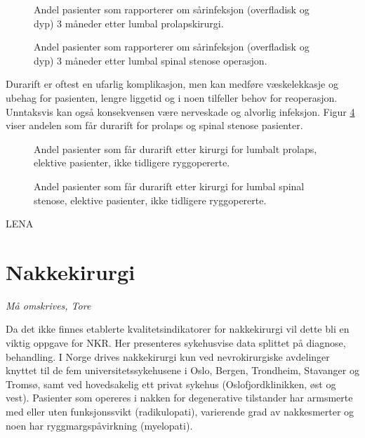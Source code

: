 \documentclass [norsk,a4paper,twoside]{article}\usepackage[]{graphicx}\usepackage[]{color}
\begin{document}
\begin{figure}[ht]
\caption{\label{fig:KpInfAvdPro} Andel pasienter som rapporterer om sårinfeksjon 
      (overfladisk og dyp) 3 måneder etter lumbal prolapskirurgi.}
\end{figure}

\begin{figure}[ht]
\caption{\label{fig:KpInfAvdSS} Andel pasienter som rapporterer om sårinfeksjon 
      (overfladisk og dyp) 3 måneder etter lumbal spinal stenose operasjon.}
\end{figure}





Durarift er oftest en ufarlig komplikasjon, men kan medføre væskelekkasje og
ubehag for pasienten, lengre liggetid og i noen tilfeller behov for reoperasjon.
Unntaksvis kan også konsekvensen være nerveskade og alvorlig infeksjon. Figur \ref{fig:Dura} viser andelen som får durarift for prolaps og spinal stenose pasienter.

\begin{figure}[ht]
      \caption{\label{fig:Dura} Andel pasienter som får durarift etter kirurgi for lumbalt prolaps, 
      elektive pasienter, ikke tidligere ryggopererte.}
      \end{figure}
      
\begin{figure}[ht]
\caption{\label{fig:Dura} Andel pasienter som får durarift etter kirurgi for lumbal 
                  spinal stenose, elektive pasienter, ikke tidligere ryggopererte.}
\end{figure}

\clearpage

LENA


            
            \section{Nakkekirurgi}
            \textit{Må omskrives, Tore}
            
            Da  det ikke finnes etablerte kvalitetsindikatorer for nakkekirurgi vil dette bli en
            viktig oppgave for NKR.  Her presenteres sykehusvise data splittet på diagnose, behandling.
            I Norge drives nakkekirurgi kun ved nevrokirurgiske avdelinger knyttet til de fem
            universitetssykehusene i Oslo, Bergen, Trondheim, Stavanger og Tromsø, samt ved
            hovedsakelig ett privat sykehus (Oslofjordklinikken, øst og vest).
            Pasienter som opereres i nakken for degenerative tilstander har armsmerte med eller 
            uten funksjonssvikt (radikulopati), varierende grad av nakkesmerter og noen har ryggmargspåvirkning (myelopati). 
            
\end{document}

